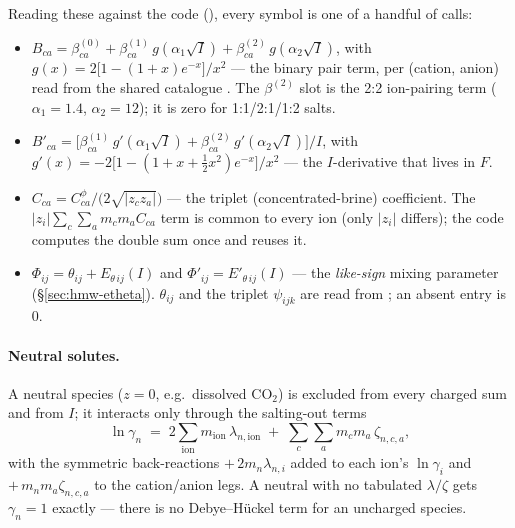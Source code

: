 \documentclass[11pt,a4paper]{article}
\begin{document}
Reading these against the code (), every symbol
is one of a handful of  calls:

\begin{itemize}[leftmargin=*,nosep,topsep=2pt]
  \item $B_{ca}=\beta^{(0)}_{ca}+\beta^{(1)}_{ca}\,g(\alpha_1\sqrt I)
        +\beta^{(2)}_{ca}\,g(\alpha_2\sqrt I)$, with
        $g(x)=2\bigl[1-(1+x)e^{-x}\bigr]/x^2$ --- the binary pair term,
        per (cation, anion) read from the shared catalogue
        .  The $\beta^{(2)}$
        slot is the 2:2 ion-pairing term ($\alpha_1=1.4$, $\alpha_2=12$);
        it is zero for 1:1/2:1/1:2 salts.
  \item $B'_{ca}=\bigl[\beta^{(1)}_{ca}\,g'(\alpha_1\sqrt I)
        +\beta^{(2)}_{ca}\,g'(\alpha_2\sqrt I)\bigr]/I$, with
        $g'(x)=-2\bigl[1-(1+x+\tfrac12 x^2)e^{-x}\bigr]/x^2$ --- the
        $I$-derivative that lives in $F$.
  \item $C_{ca}=C^{\phi}_{ca}/\bigl(2\sqrt{|z_c z_a|}\bigr)$ --- the
        triplet (concentrated-brine) coefficient.  The
        $|z_i|\sum_c\sum_a m_c m_a C_{ca}$ term is common to every ion
        (only $|z_i|$ differs); the code computes the double sum once
        and reuses it.
  \item $\Phi_{ij}=\theta_{ij}+E_{\theta\,ij}(I)$ and
        $\Phi'_{ij}=E'_{\theta\,ij}(I)$ --- the \emph{like-sign} mixing
        parameter (\S\ref{sec:hmw-etheta}).  $\theta_{ij}$ and the
        triplet $\psi_{ijk}$ are read from
        ; an absent entry is
        $0$.
\end{itemize}

\paragraph{Neutral solutes.}  A neutral species ($z=0$, e.g.\ dissolved
$\text{CO}_2$) is excluded from every charged sum and from $I$; it
interacts only through the salting-out terms
\begin{equation}
   \ln\gamma_n \;=\;
   2\sum_{\text{ion}} m_{\text{ion}}\,\lambda_{n,\text{ion}}
   \;+\; \sum_c\sum_a m_c m_a\,\zeta_{n,c,a},
   \label{eq:hmw-neutral}
\end{equation}
with the symmetric back-reactions $+\,2m_n\lambda_{n,i}$ added to each
ion's $\ln\gamma_i$ and $+\,m_n m_a \zeta_{n,c,a}$ to the cation/anion
legs.  A neutral with no tabulated $\lambda/\zeta$ gets $\gamma_n=1$
exactly --- there is no Debye--H\"uckel term for an uncharged species.
\end{document}
